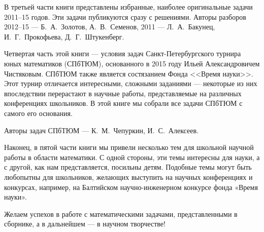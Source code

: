 \aabz В третьей части книги представлены избранные, наиболее оригинальные задачи 2011–15 годов. Эти задачи публикуются сразу с решениями. Авторы разборов 2012–15 — Б.~А.~Золотов, А.~В.~Семенов, 2011 — Л.~А.~Бакунец, И.~Г.~Прокофьева, Д.~Г.~Штукенберг.

\aabz Четвертая часть этой книги --- условия задач Санкт-Петербургского турнира юных математиков (СПбТЮМ),  основанного в 2015 году Ильей Александровичем Чистяковым. СПбТЮМ также является состязанием Фонда <<Время науки>>. Этот турнир отличается интересными, сложными заданиями --- некоторые из них впоследствии перерастают в научные работы, представляемые на различных конференциях школьников. В этой книге мы собрали все задачи СПбТЮМ с самого его основания.

\aabz Авторы задач СПбТЮМ — К.~М.~Чепуркин, И.~С.~Алексеев.

\thispagestyle{empty}

\aabz Наконец, в пятой части книги мы привели несколько тем для школьной научной работы  в области математики. С одной стороны, эти темы  интересны для науки, а с другой, как нам представляется, посильны детям. Подобные темы могут быть любопытны для школьников, желающих выступить на научных конференциях и конкурсах, например, на Балтийском научно-инженерном конкурсе фонда «Время науки».

\aabz Желаем успехов в работе с математическими задачами, представленными в сборнике, а в дальнейшем --- в научном творчестве!

